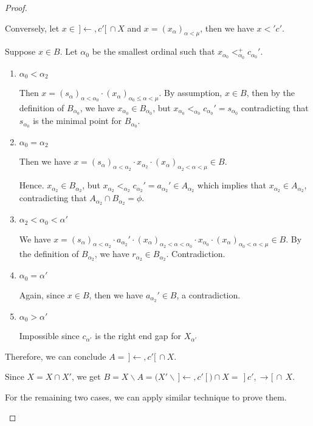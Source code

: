 \documentclass[12pt,oneside,english]{amsbook}
\numberwithin{equation}{section} %
\numberwithin{figure}{section} %
\theoremstyle{plain}
\numberwithin{section}{chapter}
\theoremstyle{plain}
\begin{document}
\begin{proof}
\begin{enumerate}
      Conversely, let $x  \in \, ] \leftarrow, c' [ \, \cap X$ and $x  =  (x_{\alpha})_{\alpha < \mu}$, then we have $x <' c'$.

      Suppose $x  \in  B$. Let $\alpha_{0}$ be the smallest ordinal such that $x_{\alpha_{0}} <_{\alpha_{0}}^+ c_{\alpha_{0}}'$.
      \begin{enumerate}
      \item $\alpha_{0} < \alpha_{2}$
        
        Then $x  =  (s_{\alpha})_{\alpha < \alpha_{0}} \cdot (x_{\alpha})_{\alpha_{0} \leq \alpha < \mu}$. By assumption, $x  \in  B$, then by the definition of $B_{\alpha_{0}}$, we have $x_{\alpha_{0}}  \in  B_{\alpha_{0}}$, but $x_{\alpha_{0}} <_{\alpha_0} c_{\alpha_{0}}'  =  s_{\alpha_{0}}$ contradicting that $s_{\alpha_{0}}$ is the minimal point for $B_{\alpha_{0}}$.
      \item $\alpha_{0}  =  \alpha_{2}$
        
        Then we have $x  =  (s_{\alpha})_{\alpha < \alpha_{2}} \cdot x_{\alpha_{2}} \cdot (x_{\alpha})_{\alpha_{2} < \alpha < \mu}  \in  B$.

        Hence. $x_{\alpha_{2}}  \in  B_{\alpha_{2}}$, but $x_{\alpha_{2}} <_{\alpha_2} c_{\alpha_{2}}'  =  a_{\alpha_{2}}'  \in  A_{\alpha_{2}}$ which implies that $x_{\alpha_{2}}  \in  A_{\alpha_{2}}$, contradicting that $A_{\alpha_{2}} \cap B_{\alpha_{2}}  =  \phi$.
      \item $\alpha_{2} < \alpha_{0} < \alpha'$
        
        We have $x  =  (s_{\alpha})_{\alpha < \alpha_{2}} \cdot a_{\alpha_{2}}' \cdot (x_{\alpha})_{\alpha_{2} < \alpha < \alpha_0} \cdot x_{\alpha_{0}} \cdot (x_{\alpha})_{\alpha_{0} < \alpha < \mu}  \in  B$. By the definition of $B_{\alpha_{2}}$, we have $r_{\alpha_{2}}  \in  B_{\alpha_{2}}$. Contradiction.
        \item $\alpha_{0}  =  \alpha'$
          
         Again, since $x \in B$, then we have $a_{\alpha_2}' \in B$, a contradiction.
        \item $\alpha_{0} > \alpha'$
          
          Impossible since $c_{\alpha'}$ is the right end gap for $X_{\alpha'}$
        \end{enumerate}

        Therefore, we can conclude $A  = \, ] \leftarrow, c' [ \, \cap X$.

        Since $X  =  X \cap X'$, we get $B  =  X \backslash A  =  (X' \backslash \, ] \leftarrow, c' [ ) \cap  X  = \, ] c', \rightarrow [ \, \cap \, X$.

        For the remaining two cases, we can apply similar technique to prove them.
    \end{enumerate}
\end{proof}
\end{document}

